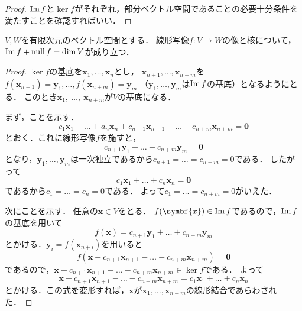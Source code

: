 \documentclass[../sotsu.tex]{subfiles}
\begin{document}
\begin{proof}
    $\operatorname{Im} f$と$\ker f$がそれぞれ，部分ベクトル空間であることの必要十分条件を満たすことを確認すればいい．
\end{proof}


\begin{theorem}
    \label{thm:rank-nullity}
    $V, W$を有限次元のベクトル空間とする．
    線形写像$f \colon V \to W$の像と核について，
    $\operatorname{Im} f + \operatorname{null} f = \dim V$が成り立つ\cite[\S 5.1]{miyake-lin-2008}．
\end{theorem}

\begin{proof}
    $\ker f$の基底を$\symbf{x}_1, \dots, \symbf{x}_n$とし，
    $\symbf{x}_{n+1}, \dots, \symbf{x}_{n+m}$を
    $f(\symbf{x}_{n+1}) = \symbf{y}_1, \dots, f(\symbf{x}_{n+m}) = \symbf{y}_m$
    （$\symbf{y}_1, \dots, \symbf{y}_m$は$\operatorname{Im} f$の基底）となるようにとる．
    このとき$\symbf{x}_1, \  \dotsc, \  \symbf{x}_{n+m}$が$V$の基底になる．

    まず，ことを示す．
    \begin{equation*}
        c_1 \symbf{x}_1 + \dots + a_n \symbf{x}_n
            + c_{n+1} \symbf{x}_{n+1} + \dots + c_{n+m} \symbf{x}_{n+m}
                = \symbf{0}
    \end{equation*}
    とおく．これに線形写像$f$を施すと，
    \begin{equation*}
        c_{n+1} \symbf{y}_{1} + \dots + c_{n+m} \symbf{y}_{m} = \symbf{0}
    \end{equation*}
    となり，$\symbf{y}_1, \dots, \symbf{y}_m$は一次独立であるから$c_{n+1} = \dots = c_{n+m} = 0$である．
    したがって
    \begin{equation*}
        c_1 \symbf{x}_1 + \dots + c_n \symbf{x}_n = \symbf{0}
    \end{equation*}
    であるから$c_1 = \dots = c_n = 0$である．
    よって$c_1 = \dots = c_{n+m} = 0$がいえた．

    次にことを示す．
    任意の$\symbf{x} \in V$をとる．
    $f(\symbf{x}) \in \image f$であるので，$\operatorname{Im} f$の基底を用いて
    \begin{equation*}
        f(\symbf{x}) = c_{n+1} \symbf{y}_1 + \dots + c_{n+m} \symbf{y}_m
    \end{equation*}
    とかける．$\symbf{y}_i = f(\symbf{x}_{n+i})$を用いると
    \begin{equation*}
        f(\symbf{x} - c_{n+1} \symbf{x}_{n+1} - \dots - c_{n+m} \symbf{x}_{n+m}) = \symbf{0}
    \end{equation*}
    であるので，$\symbf{x} - c_{n+1} \symbf{x}_{n+1} - \dots - c_{n+m} \symbf{x}_{n+m} \in \ker f$である．
    よって
    \begin{equation*}
        \symbf{x} - c_{n+1} \symbf{x}_{n+1} - \dots - c_{n+m} \symbf{x}_{n+m} 
            = c_1 \symbf{x}_1 + \dots + c_n \symbf{x}_n
    \end{equation*}
    とかける．この式を変形すれば，$\symbf{x}$が$\symbf{x}_1, \dots, \symbf{x}_{n+m}$の線形結合であらわされた．
\end{proof}
\end{document}
